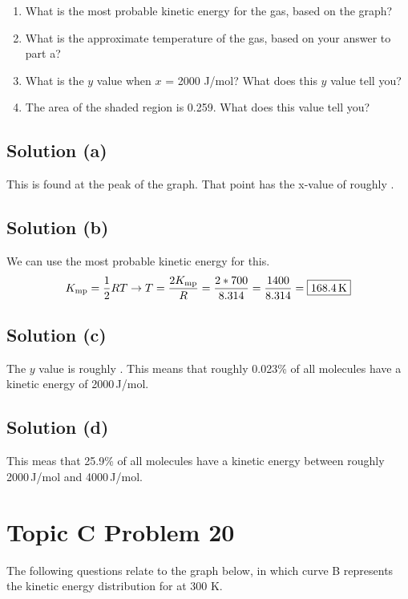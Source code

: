 \documentclass[10pt]{article}
\begin{document}
        \begin{enumerate} [label=\alph*)]
            \item What is the most probable kinetic energy for the gas, based on the graph?
            \item What is the approximate temperature of the gas, based on your answer to part a?
            \item What is the $y$ value when $x$ = 2000 J/mol? What does this $y$ value tell you?
            \item The area of the shaded region is 0.259. What does this value tell you?
        \end{enumerate}

        \subsection{Solution (a)}
            This is found at the peak of the graph.
            That point has the x-value of roughly . 

        \subsection{Solution (b)}
            We can use the most probable kinetic energy for this. 
            \begin{gather}
                K_{\rm mp} = \frac{1}{2} RT \to
                T   =   \frac{2K_{\rm mp}}{R}
                    =   \frac{2 * 700}{8.314}
                    =   \frac{1400}{8.314}
                    =   \boxed{168.4\,\unit{\kelvin}}
            \end{gather}
        
        \subsection{Solution (c)}
            The $y$ value is roughly . 
            This means that roughly 0.023\% of all molecules have a kinetic energy of 2000\,\unit{\joule/\mole}. 
        
        \subsection{Solution (d)}
            This meas that 25.9\% of all molecules have a kinetic energy between roughly 2000\,\unit{\joule/\mole} and 4000\,\unit{\joule/\mole}. 

    \pagebreak
    \section{Topic C Problem 20}
        The following questions relate to the graph below, in which curve B represents the kinetic energy distribution for  at 300 K.
\end{document}
